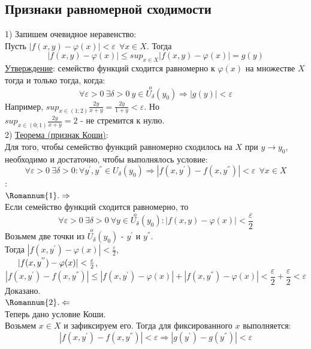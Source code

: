 \documentclass[12pt]{article}
\begin{document}
\subsection{Признаки равномерной сходимости}
1) Запишем очевидное неравенство:\\
Пусть $|f(x,y)-\varphi(x)|<\varepsilon \ \ \forall x \in X$. Тогда\\
$$|f(x,y)-\varphi(x)| \leq sup_{x \in X} |f(x,y) - \varphi(x)| = g(y)$$
\uline{Утверждение}: семейство функций сходится равномерно к $\varphi(x)$ на множестве $X$ тогда и только тогда, когда:\\
$$\forall \varepsilon > 0 \ \exists \delta > 0 \ y \in \overset{o}{U_{\delta}}(y_0) \Rightarrow |g(y)|<\varepsilon$$
Например, $sup_{x\in (1;2)} \frac{2y}{x+y} = \frac{2y}{1+y} < \varepsilon$. Но\\
$sup_{x \in (0;1)} \frac{2y}{x+y} = 2$ - не стремится к нулю.\\
2) \uline{Теорема (признак Коши)}:\\
Для того, чтобы семейство функций равномерно сходилось на $X$ при $y \to y_0$, необходимо и достаточно, чтобы выполнялось условие:\\
$$\forall \varepsilon > 0 \ \exists \delta > 0 : \forall y^{'}, y^{''} \in U_{\delta}(y_0) \Rightarrow |f(x,y^{'})-f(x,y^{''})| < \varepsilon \ \ \forall x \in X$$
:\\
$\Romannum{1}. \Rightarrow$\\
Если семейство функций сходится равномерно, то\\
$$\forall \varepsilon > 0 \ \exists \delta > 0 \  \forall y \in \overset{o}{U_\delta}(y_0): |f(x,y)-\varphi(x)|<\frac{\varepsilon}{2}$$
Возьмем две точки из $\overset{o}{U_\delta}(y_0)$ - $y^{'}$ и $y^{''}$.\\
Тогда $|f(x,y^{'})-\varphi(x)| < \frac{\varepsilon}{2}$,\\
$\indent |f(x,y^{''})-\varphi(x)| < \frac{\varepsilon}{2}$,\\
$$|f(x,y^{'})-f(x,y^{''})| \leq |f(x,y^{'})-\varphi(x)| + |f(x,y^{''})-\varphi(x)| < \frac{\varepsilon}{2} + \frac{\varepsilon}{2} < \varepsilon$$
Доказано.\\
$\Romannum{2}. \Leftarrow$\\
Теперь дано условие Коши.\\
Возьмем $x \in X$ и зафиксируем его. Тогда для фиксированного $x$ выполняется:\\
$$|f(x,y^{'})-f(x,y^{''})| < \varepsilon \Rightarrow |g(y^{'})-g(y^{''})| < \varepsilon$$
\end{document}
